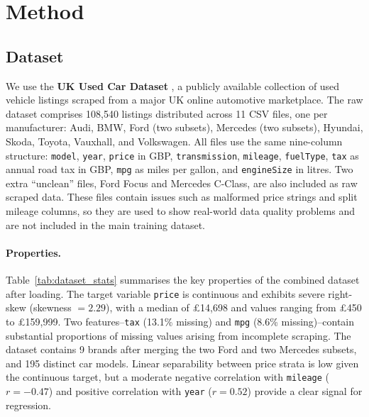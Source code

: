 \section{Method}
\label{sec:method}

\subsection{Dataset}
\label{sec:dataset}

We use the \textbf{UK Used Car Dataset} \cite{usedcardataset2021}, a publicly available collection of used vehicle listings scraped from a major UK online automotive marketplace.
The raw dataset comprises 108{,}540 listings distributed across 11 CSV files, one per manufacturer: Audi, BMW, Ford (two subsets), Mercedes (two subsets), Hyundai, Skoda, Toyota, Vauxhall, and Volkswagen.
All files use the same nine-column structure: \texttt{model}, \texttt{year}, \texttt{price} in GBP, \texttt{transmission}, \texttt{mileage}, \texttt{fuelType}, \texttt{tax} as annual road tax in GBP, \texttt{mpg} as miles per gallon, and \texttt{engineSize} in litres.
Two extra ``unclean'' files, Ford Focus and Mercedes C-Class, are also included as raw scraped data.
These files contain issues such as malformed price strings and split mileage columns, so they are used to show real-world data quality problems and are not included in the main training dataset.

\paragraph{Properties.}
Table~\ref{tab:dataset_stats} summarises the key properties of the combined dataset after loading.
The target variable \texttt{price} is continuous and exhibits severe right-skew (skewness $= 2.29$), with a median of \pounds{}14{,}698 and values ranging from \pounds{}450 to \pounds{}159{,}999.
Two features--\texttt{tax} (13.1\% missing) and \texttt{mpg} (8.6\% missing)--contain substantial proportions of missing values arising from incomplete scraping.
The dataset contains 9 brands after merging the two Ford and two Mercedes subsets, and 195 distinct car models.
Linear separability between price strata is low given the continuous target, but a moderate negative correlation with \texttt{mileage} ($r = -0.47$) and positive correlation with \texttt{year} ($r = 0.52$) provide a clear signal for regression.

